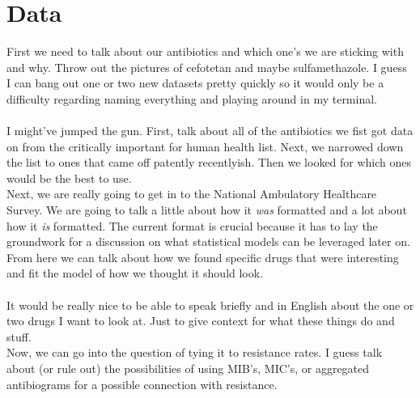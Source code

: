 \documentclass[11pt]{SelfArxOneColBMN}
\begin{document}




\section{Data}
\label{sec:data}

\noindent
First we need to talk about our antibiotics and which one's we are sticking with and why. Throw out the pictures of cefotetan and maybe sulfamethazole. I guess I can bang out one or two new datasets pretty quickly so it would only be a difficulty regarding naming everything and playing around in my terminal.\\
\\
I might've jumped the gun. First, talk about all of the antibiotics we fist got data on from the critically important for human health list. Next, we narrowed down the list to ones that came off patently recentlyish. Then we looked for which ones would be the best to use.
\\
Next, we are really going to get in to the National Ambulatory Healthcare Survey. We are going to talk a little about how it \textit{was} formatted and a lot about how it \textit{is} formatted. The current format is crucial because it has to lay the groundwork for a discussion on what statistical models can be leveraged later on. From here we can talk about how we found specific drugs that were interesting and fit the model of how we thought it should look.\\
\\
It would be really nice to be able to speak briefly and in English about the one or two drugs I want to look at. Just to give context for what these things do and stuff.
\\
\noindent
Now, we can go into the question of tying it to resistance rates. I guess talk about (or rule out) the possibilities of using MIB's, MIC's, or aggregated antibiograms for a possible connection with resistance. 
\end{document}
